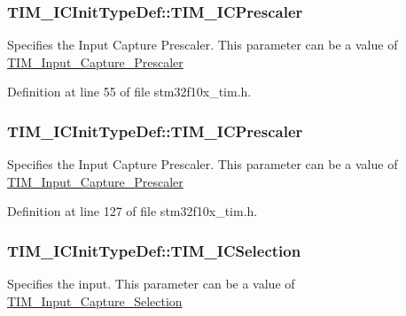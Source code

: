 \subsubsection[{\texorpdfstring{T\+I\+M\+\_\+\+I\+C\+Prescaler}{TIM_ICPrescaler}}]{ T\+I\+M\+\_\+\+I\+C\+Init\+Type\+Def\+::\+T\+I\+M\+\_\+\+I\+C\+Prescaler}\hypertarget{struct_t_i_m___i_c_init_type_def_a77aaa302d1e8d890dbd46388ae393bac}{}\label{struct_t_i_m___i_c_init_type_def_a77aaa302d1e8d890dbd46388ae393bac}
Specifies the Input Capture Prescaler. This parameter can be a value of \hyperlink{group___t_i_m___input___capture___prescaler}{T\+I\+M\+\_\+\+Input\+\_\+\+Capture\+\_\+\+Prescaler} 

Definition at line 55 of file stm32f10x\+\_\+tim.\+h.

\subsubsection[{\texorpdfstring{T\+I\+M\+\_\+\+I\+C\+Prescaler}{TIM_ICPrescaler}}]{ T\+I\+M\+\_\+\+I\+C\+Init\+Type\+Def\+::\+T\+I\+M\+\_\+\+I\+C\+Prescaler}\hypertarget{struct_t_i_m___i_c_init_type_def_ac61c7fc999ace295ac81b304cabd61e0}{}\label{struct_t_i_m___i_c_init_type_def_ac61c7fc999ace295ac81b304cabd61e0}
Specifies the Input Capture Prescaler. This parameter can be a value of \hyperlink{group___t_i_m___input___capture___prescaler}{T\+I\+M\+\_\+\+Input\+\_\+\+Capture\+\_\+\+Prescaler} 

Definition at line 127 of file stm32f10x\+\_\+tim.\+h.

\subsubsection[{\texorpdfstring{T\+I\+M\+\_\+\+I\+C\+Selection}{TIM_ICSelection}}]{ T\+I\+M\+\_\+\+I\+C\+Init\+Type\+Def\+::\+T\+I\+M\+\_\+\+I\+C\+Selection}\hypertarget{struct_t_i_m___i_c_init_type_def_a70ccc8b1a7d9f0f8edba13fb658bb6a0}{}\label{struct_t_i_m___i_c_init_type_def_a70ccc8b1a7d9f0f8edba13fb658bb6a0}
Specifies the input. This parameter can be a value of \hyperlink{group___t_i_m___input___capture___selection}{T\+I\+M\+\_\+\+Input\+\_\+\+Capture\+\_\+\+Selection} 


